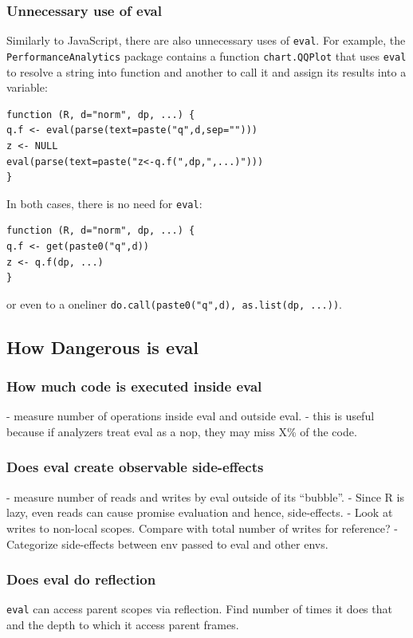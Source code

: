 \documentclass[a4paper,USenglish,cleveref, autoref, thm-restate]{lipics-v2019}
\newcommand{\eval}{\texttt{eval}\xspace}
\renewcommand{\c}[1]{\lstinline{#1}\xspace}
\begin{document}
  \subsubsection{Unnecessary use of eval}
  Similarly to JavaScript, there are also unnecessary uses of \eval.
  For example, the \c{PerformanceAnalytics} package contains a function
  \c{chart.QQPlot} that uses \eval to resolve a string into function and
  another to call it and assign its results into a variable:
  \begin{lstlisting}
function (R, d="norm", dp, ...) {
q.f <- eval(parse(text=paste("q",d,sep="")))
z <- NULL
eval(parse(text=paste("z<-q.f(",dp,",...)")))
}
  \end{lstlisting}
  In both cases, there is no need for \eval:
  \begin{lstlisting}
function (R, d="norm", dp, ...) {
q.f <- get(paste0("q",d))
z <- q.f(dp, ...)
}
  \end{lstlisting}
  or even to a oneliner \c{do.call(paste0("q",d), as.list(dp, ...))}.

\subsection{How Dangerous is eval}

\subsubsection{How much code is executed inside eval}
- measure number of operations inside eval and outside eval.
- this is useful because if analyzers treat eval as a nop, they may miss X\% of the code.

\subsubsection{Does eval create observable side-effects}
- measure number of reads and writes by eval outside of its ``bubble''.
- Since R is lazy, even reads can cause promise evaluation and hence, side-effects.
- Look at writes to non-local scopes. Compare with total number of writes for
reference?
- Categorize side-effects between env passed to eval and other envs.

\subsubsection{Does eval do reflection}
\eval can access parent scopes via reflection. Find number of times it does that
and the depth to which it access parent frames.
\end{document}
